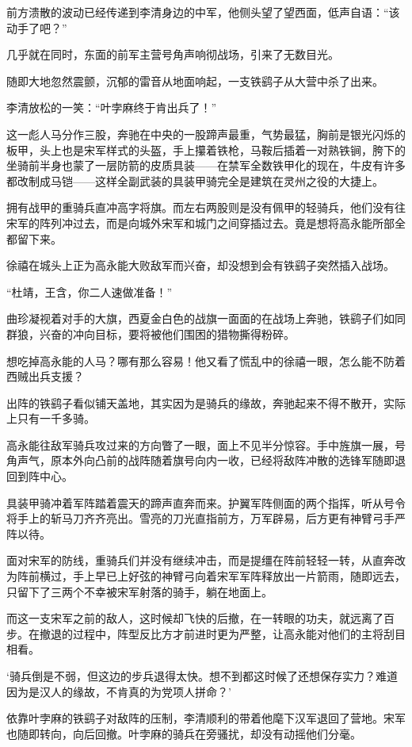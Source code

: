 前方溃散的波动已经传递到李清身边的中军，他侧头望了望西面，低声自语：“该动手了吧？”

几乎就在同时，东面的前军主营号角声响彻战场，引来了无数目光。

随即大地忽然震颤，沉郁的雷音从地面响起，一支铁鹞子从大营中杀了出来。

李清放松的一笑：“叶孛麻终于肯出兵了！”

这一彪人马分作三股，奔驰在中央的一股蹄声最重，气势最猛，胸前是银光闪烁的板甲，头上也是宋军样式的头盔，手上攥着铁枪，马鞍后插着一对熟铁锏，胯下的坐骑前半身也蒙了一层防箭的皮质具装——在禁军全数铁甲化的现在，牛皮有许多都改制成马铠——这样全副武装的具装甲骑完全是建筑在灵州之役的大捷上。

拥有战甲的重骑兵直冲高字将旗。而左右两股则是没有佩甲的轻骑兵，他们没有往宋军的阵列冲过去，而是向城外宋军和城门之间穿插过去。竟是想将高永能所部全都留下来。

徐禧在城头上正为高永能大败敌军而兴奋，却没想到会有铁鹞子突然插入战场。

“杜靖，王含，你二人速做准备！”

曲珍凝视着对手的大旗，西夏金白色的战旗一面面的在战场上奔驰，铁鹞子们如同群狼，兴奋的冲向目标，要将被他们围困的猎物撕得粉碎。

想吃掉高永能的人马？哪有那么容易！他又看了慌乱中的徐禧一眼，怎么能不防着西贼出兵支援？

出阵的铁鹞子看似铺天盖地，其实因为是骑兵的缘故，奔驰起来不得不散开，实际上只有一千多骑。

高永能往敌军骑兵攻过来的方向瞥了一眼，面上不见半分惊容。手中旌旗一展，号角声气，原本外向凸前的战阵随着旗号向内一收，已经将敌阵冲散的选锋军随即退回到阵中心。

具装甲骑冲着军阵踏着震天的蹄声直奔而来。护翼军阵侧面的两个指挥，听从号令将手上的斩马刀齐齐亮出。雪亮的刀光直指前方，万军辟易，后方更有神臂弓手严阵以待。

面对宋军的防线，重骑兵们并没有继续冲击，而是提缰在阵前轻轻一转，从直奔改为阵前横过，手上早已上好弦的神臂弓向着宋军军阵释放出一片箭雨，随即远去，只留下了三两个不幸被宋军射落的骑手，躺在地面上。

而这一支宋军之前的敌人，这时候却飞快的后撤，在一转眼的功夫，就远离了百步。在撤退的过程中，阵型反比方才前进时更为严整，让高永能对他们的主将刮目相看。

‘骑兵倒是不弱，但这边的步兵退得太快。想不到都这时候了还想保存实力？难道因为是汉人的缘故，不肯真的为党项人拼命？’

依靠叶孛麻的铁鹞子对敌阵的压制，李清顺利的带着他麾下汉军退回了营地。宋军也随即转向，向后回撤。叶孛麻的骑兵在旁骚扰，却没有动摇他们分毫。


